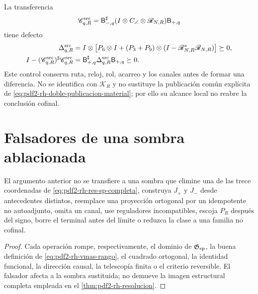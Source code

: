 La transferencia
\begin{equation}\label{eq:pdf2-rh-source-transferencia}
 \mathscr C_{q,R}^{\rm src}
 =\mathsf B_{-,q}^{\sharp}
  (I\otimes C_\angle\otimes\mathscr R_{N,R})\mathsf B_{+,q}
\end{equation}
tiene defecto
\begin{align}
 \Delta_{q,R}^{\rm src}
 ={}&I\otimes\bigl[P_6\otimes I
 +(P_3+P_9)\otimes
 (I-\mathscr R_{N,R}^*\mathscr R_{N,R})\bigr]\succeq0,
 \label{eq:pdf2-rh-source-delta}\\
 I-(\mathscr C_{q,R}^{\rm src})^\sharp\mathscr C_{q,R}^{\rm src}
 ={}&\mathsf B_{+,q}^{\sharp}\Delta_{q,R}^{\rm src}
 \mathsf B_{+,q}\succeq0.
 \label{eq:pdf2-rh-source-contractividad}
\end{align}
Este control conserva ruta, reloj, rol, acarreo y los canales antes de formar
una diferencia. No se identifica con \(\mathcal K_R\) y no sustituye la
publicación común explícita de
\eqref{eq:pdf2-rh-doble-publicacion-material}; por ello su alcance local no
reabre la conclusión cofinal.

\section{Falsadores de una sombra ablacionada}

\begin{falsifier}
El argumento anterior no se transfiere a una sombra que elimine una de las
trece coordenadas de \eqref{eq:pdf2-rh-res-sp-completa}, construya \(J_+\) y
\(J_-\) desde antecedentes distintos, reemplace una proyección ortogonal por
un idempotente no autoadjunto, omita un canal, use reguladores incompatibles,
escoja \(P_R\) después del signo, borre el terminal antes del límite o reduzca
la clase a una familia no cofinal.
\end{falsifier}

\begin{proof}
Cada operación rompe, respectivamente, el dominio de
\(\mathfrak G_{\rm sp}\), la buena definición de
\eqref{eq:pdf2-rh-vmas-rango}, el cuadrado ortogonal, la identidad funcional,
la dirección causal, la telescopía finita o el criterio reversible. El
falsador afecta a la sombra sustituida; no demueve la imagen estructural
completa empleada en el \cref{thm:pdf2-rh-resolucion}.
\end{proof}

